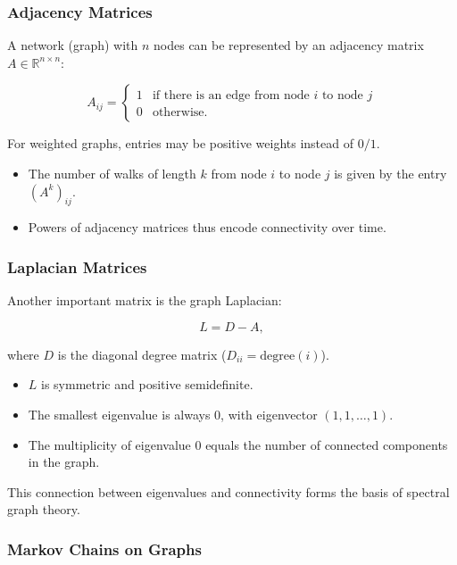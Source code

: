 \documentclass[
  12pt,
  a4paper,
]{article}
\begin{document}
\subsubsection{Adjacency Matrices}\label{adjacency-matrices}

A network (graph) with \(n\) nodes can be represented by an adjacency
matrix \(A \in \mathbb{R}^{n \times n}\):

\[A_{ij} =
\begin{cases}
1 & \text{if there is an edge from node \(i\) to node \(j\)} \\
0 & \text{otherwise.}
\end{cases}\]

For weighted graphs, entries may be positive weights instead of \(0/1\).

\begin{itemize}
\item
  The number of walks of length \(k\) from node \(i\) to node \(j\) is
  given by the entry \((A^k)_{ij}\).
\item
  Powers of adjacency matrices thus encode connectivity over time.
\end{itemize}

\subsubsection{Laplacian Matrices}\label{laplacian-matrices}

Another important matrix is the graph Laplacian:

\[L = D - A,\]

where \(D\) is the diagonal degree matrix
(\(D_{ii} = \text{degree}(i)\)).

\begin{itemize}
\item
  \(L\) is symmetric and positive semidefinite.
\item
  The smallest eigenvalue is always \(0\), with eigenvector
  \((1,1,\dots,1)\).
\item
  The multiplicity of eigenvalue \(0\) equals the number of connected
  components in the graph.
\end{itemize}

This connection between eigenvalues and connectivity forms the basis of
spectral graph theory.

\subsubsection{Markov Chains on Graphs}\label{markov-chains-on-graphs}
\end{document}

